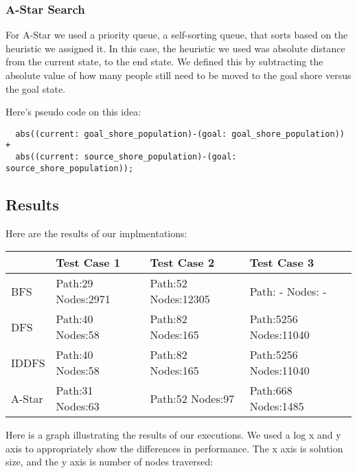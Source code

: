 \documentclass[10pt,letterpaper]{article}
\begin{document}
	\subsubsection{A-Star Search}
For A-Star we used a priority queue, a self-sorting queue, that sorts based on
the heuristic we assigned it. In this case, the heuristic we used was absolute
distance from the current state, to the end state. We defined this by subtracting
the absolute value of how many people still need to be moved to the goal shore
versus the goal state.

Here's pseudo code on this idea:
\begin{lstlisting}
  abs((current: goal_shore_population)-(goal: goal_shore_population)) +
  abs((current: source_shore_population)-(goal: source_shore_population));
\end{lstlisting}

  \subsection{Results}
  Here are the results of our implmentations:

  \begin{center}
      \begin{tabular}{ | l | p{2cm} | p{2cm} | p{2cm} |}
      \hline
      & Test Case 1 & Test Case 2 & Test Case 3 \\ \hline
      BFS & Path:29  Nodes:2971 & Path:52 Nodes:12305  & Path: - Nodes: - \\ \hline
      DFS & Path:40  Nodes:58 & Path:82 Nodes:165 & Path:5256  Nodes:11040 \\ \hline
      IDDFS & Path:40  Nodes:58 & Path:82 Nodes:165 & Path:5256  Nodes:11040 \\ \hline
      A-Star & Path:31  Nodes:63 & Path:52 Nodes:97 & Path:668  Nodes:1485 \\ \hline
      \end{tabular}
  \end{center}


	Here is a graph illustrating the results of our executions. We used a log x and
  y axis to appropriately show the differences in performance. The x axis is solution
  size, and the y axis is number of nodes traversed:
\end{document}

